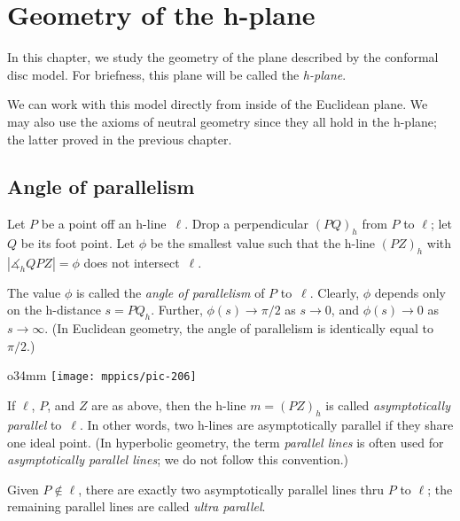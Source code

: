 \chapter{Geometry of the h-plane}\label{chap:h-plane}

In this chapter, we study the geometry of the plane described by the conformal disc model.
For briefness, this plane will be called the {}\emph{h-plane}.

We can work with this model directly from inside of the Euclidean plane. 
We may also use the axioms of neutral geometry since they all hold in the h-plane; the latter proved in the previous chapter.

\section*{Angle of parallelism}

Let $P$ be a point off an h-line~$\ell$. 
Drop a perpendicular $(PQ)_h$ from $P$ to $\ell$;
let $Q$ be its foot point.
Let $\phi$ be the smallest value such that the h-line $(PZ)_h$ with $|\measuredangle_h Q P Z|=\phi$ does not intersect~$\ell$.

The value $\phi$ is called the \emph{angle of parallelism} of $P$ to~$\ell$.
Clearly, $\phi$ depends only on the h-distance $s=PQ_h$.
Further, $\phi(s)\to \pi/2$ as $s\to 0$, 
and $\phi(s)\to0$ as $s\to\infty$.
(In Euclidean geometry, the angle of parallelism is identically equal to~$\pi/2$.)

\begin{wrapfigure}{o}{34mm}
\vskip-6mm
\centering
\texttt{[image: mppics/pic-206]}
\end{wrapfigure}

If $\ell$, $P$, and $Z$ are as above, then the h-line $m=(PZ)_h$ is called \emph{asymptotically parallel} to~$\ell$.
In other words, two h-lines are asymptotically parallel if they share one ideal point.
(In hyperbolic geometry, the term {}\emph{parallel lines} is often used for \emph{asymptotically parallel lines}; we do not follow this convention.)

Given $P\not\in\ell$, there are exactly two asymptotically parallel lines thru $P$ to $\ell$; 
the remaining parallel lines are called \emph{ultra parallel}.



